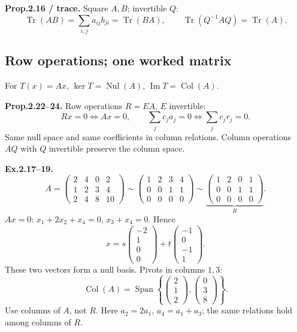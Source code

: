 \documentclass[11pt,letterpaper]{article}
\begin{document}
\textbf{Prop.2.16 / trace.} Square \(A,B\); invertible \(Q\): \[
\operatorname{Tr}(AB)=\sum_{i,j}a_{ij}b_{ji}=\operatorname{Tr}(BA),\qquad
\operatorname{Tr}(Q^{-1}AQ)=\operatorname{Tr}(A).
\]

\newpage

\subsection{Row operations; one worked
matrix}\label{row-operations-one-worked-matrix}

For \(T(x)=Ax\), \(\ker T=\operatorname{Nul}(A)\),
\(\operatorname{Im}T=\operatorname{Col}(A)\).

\textbf{Prop.2.22--24.} Row operations \(R=EA\), \(E\) invertible: \[
Rx=0\iff Ax=0,\qquad
\sum_j c_ja_j=0\iff\sum_j c_jr_j=0.
\] Same null space and same coefficients in column relations. Column
operations \(AQ\) with \(Q\) invertible preserve the column space.

\textbf{Ex.2.17--19.} \[
A=\begin{pmatrix}2&4&0&2\\1&2&3&4\\2&4&8&10\end{pmatrix}
\sim\begin{pmatrix}1&2&3&4\\0&0&1&1\\0&0&0&0\end{pmatrix}
\sim\underbrace{\begin{pmatrix}1&2&0&1\\0&0&1&1\\0&0&0&0\end{pmatrix}}_R.
\] \(Ax=0\): \(x_1+2x_2+x_4=0\), \(x_3+x_4=0\). Hence \[
x=s\begin{pmatrix}-2\\1\\0\\0\end{pmatrix}
+t\begin{pmatrix}-1\\0\\-1\\1\end{pmatrix}.
\] These two vectors form a null basis. Pivots in columns \(1,3\): \[
\operatorname{Col}(A)=\operatorname{Span}\left\{
\begin{pmatrix}2\\1\\2\end{pmatrix},
\begin{pmatrix}0\\3\\8\end{pmatrix}\right\}.
\] Use columns of \(A\), not \(R\). Here \(a_2=2a_1\), \(a_4=a_1+a_3\);
the same relations hold among columns of \(R\).
\end{document}
